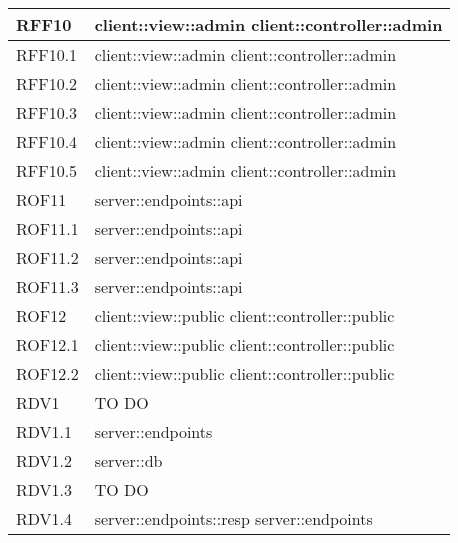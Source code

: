 \begin{center}
\begin{longtable}{| p{4cm} | p{8cm} |}
RFF10   &  client::view::admin \newline client::controller::admin  \\
\hline
RFF10.1   &  client::view::admin \newline client::controller::admin \\
\hline
RFF10.2   &  client::view::admin \newline client::controller::admin \\
\hline
RFF10.3   &  client::view::admin \newline client::controller::admin \\
\hline
RFF10.4   &  client::view::admin \newline client::controller::admin \\
\hline
RFF10.5   &  client::view::admin \newline client::controller::admin \\
\hline

ROF11   &  server::endpoints::api \\
\hline
ROF11.1   &  server::endpoints::api \\
\hline
ROF11.2   &  server::endpoints::api \\
\hline
ROF11.3   &  server::endpoints::api \\
\hline

ROF12   &  client::view::public \newline client::controller::public \\
\hline
ROF12.1   &  client::view::public \newline client::controller::public \\
\hline
ROF12.2   &  client::view::public \newline client::controller::public \\
\hline


RDV1   &  TO DO \\
\hline
RDV1.1   &  server::endpoints \\
\hline
RDV1.2   &  server::db \\
\hline
RDV1.3   &  TO DO \\
\hline
RDV1.4   &  server::endpoints::resp \newline server::endpoints \\
\hline


\end{longtable}
\end{center}
